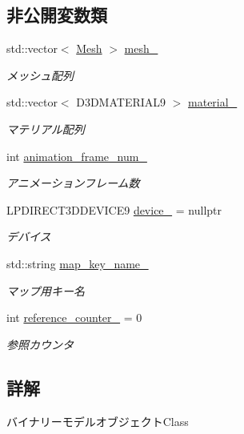 \subsection*{非公開変数類}
\begin{DoxyCompactItemize}
\item 
std\+::vector$<$ \mbox{\hyperlink{class_md_bin_object_1_1_mesh}{Mesh}} $>$ \mbox{\hyperlink{class_md_bin_object_adc0dda60521142c2d28515c6e420d98d}{mesh\+\_\+}}
\begin{DoxyCompactList}\small\item\em メッシュ配列 \end{DoxyCompactList}\item 
std\+::vector$<$ D3\+D\+M\+A\+T\+E\+R\+I\+A\+L9 $>$ \mbox{\hyperlink{class_md_bin_object_a6ca9c1660858728f137ea2332d2e35b4}{material\+\_\+}}
\begin{DoxyCompactList}\small\item\em マテリアル配列 \end{DoxyCompactList}\item 
int \mbox{\hyperlink{class_md_bin_object_aea79e88d1c9995b89068769696d905b8}{animation\+\_\+frame\+\_\+num\+\_\+}}
\begin{DoxyCompactList}\small\item\em アニメーションフレーム数 \end{DoxyCompactList}\item 
L\+P\+D\+I\+R\+E\+C\+T3\+D\+D\+E\+V\+I\+C\+E9 \mbox{\hyperlink{class_md_bin_object_a9d517ed808239bc9b467279917cdedcc}{device\+\_\+}} = nullptr
\begin{DoxyCompactList}\small\item\em デバイス \end{DoxyCompactList}\item 
std\+::string \mbox{\hyperlink{class_md_bin_object_a142924aebfbaa5ef876e17bea5f2596a}{map\+\_\+key\+\_\+name\+\_\+}}
\begin{DoxyCompactList}\small\item\em マップ用キー名 \end{DoxyCompactList}\item 
int \mbox{\hyperlink{class_md_bin_object_af8d14336c5f8c2d502d65fd99b9bb871}{reference\+\_\+counter\+\_\+}} = 0
\begin{DoxyCompactList}\small\item\em 参照カウンタ \end{DoxyCompactList}\end{DoxyCompactItemize}


\subsection{詳解}
バイナリーモデルオブジェクト\+Class 

